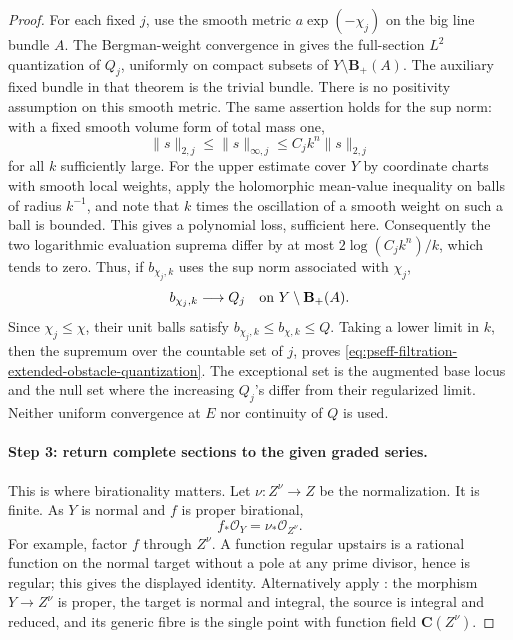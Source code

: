 \begin{proof}
For each fixed \(j\), use the smooth metric \(a\exp(-\chi_j)\) on the big
line bundle \(A\).
The Bergman-weight convergence in \cite[Theorem~1.4]{Ber11} gives
the full-section \(L^2\) quantization of \(Q_j\), uniformly on compact
subsets of \(Y\setminus\mathbf B_+(A)\).
The auxiliary fixed bundle in that theorem is the trivial bundle.
There is no positivity assumption on this smooth metric.
The same assertion holds for the sup norm: with a fixed smooth volume
form of total mass one,
\[
 \|s\|_{2,j}\leq\|s\|_{\infty,j}
       \leq C_j k^n\|s\|_{2,j}
\]
for all \(k\) sufficiently large.  For the upper estimate cover \(Y\)
by coordinate charts with smooth local weights, apply the holomorphic
mean-value inequality on balls of radius \(k^{-1}\), and note that
\(k\) times the oscillation of a smooth weight on such a ball is bounded.
This gives a polynomial loss, sufficient here.
Consequently the two logarithmic evaluation suprema differ by at most
\(2\log(C_jk^n)/k\), which tends to zero.
Thus, if \(b_{\chi_j,k}\) uses the sup norm associated with \(\chi_j\),
\[
                  b_{\chi_j,k}\longrightarrow Q_j
             \quad\hbox{on }Y\setminus\mathbf B_+(A).
\]
Since \(\chi_j\leq\chi\), their unit balls satisfy
\(b_{\chi_j,k}\leq b_{\chi,k}\leq Q\).
Taking a lower limit in \(k\), then the supremum over the countable set
of \(j\), proves \eqref{eq:pseff-filtration-extended-obstacle-quantization}.
The exceptional set is the augmented base locus and the null set where
the increasing \(Q_j\)'s differ from their regularized limit.
Neither uniform convergence at \(E\) nor continuity of \(Q\) is used.

\paragraph{Step 3: return complete sections to the given graded series.}
This is where birationality matters.
Let \(\nu:Z^\nu\to Z\) be the normalization.  It is finite.
As \(Y\) is normal and \(f\) is proper birational,
\[
                         f_*\mathcal O_Y=\nu_*\mathcal O_{Z^\nu}.
\]
For example, factor \(f\) through \(Z^\nu\).
A function regular upstairs is a rational function on the normal target
without a pole at any prime divisor, hence is regular; this gives the
displayed identity.  Alternatively apply \cite[Tag~0AY8]{StacksProject}:
the morphism \(Y\to Z^\nu\) is proper, the target is normal and integral,
the source is integral and reduced, and its generic fibre is the single
point with function field \(\mathbf C(Z^\nu)\).


\end{proof}
